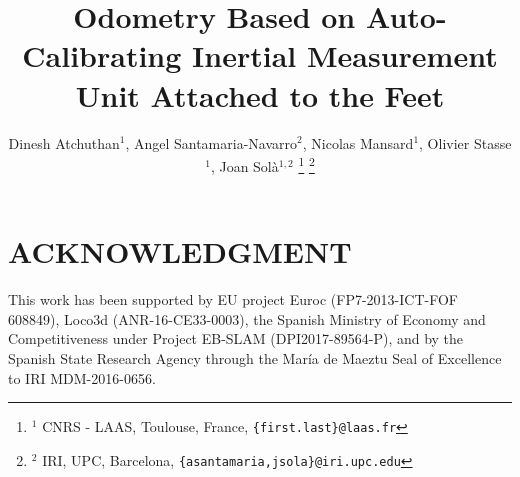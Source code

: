 \documentclass[letterpaper, 10 pt, conference]{ieeeconf}  %
\title{\LARGE \bf
Odometry Based on Auto-Calibrating Inertial Measurement Unit Attached to the Feet
}
\author{Dinesh Atchuthan$^{1}$, Angel Santamaria-Navarro$^{2}$, Nicolas Mansard$^1$, Olivier Stasse$^1$, Joan Sol\`a$^{1,2}$%
\thanks{$^{1}$ CNRS - LAAS, Toulouse, France, \tt {\footnotesize \{first.last\}@laas.fr}}%
\thanks{$^{2}$ IRI, UPC, Barcelona, \tt{\footnotesize \{asantamaria,jsola\}@iri.upc.edu}}
}
\begin{document}
\maketitle
\thispagestyle{empty}
\pagestyle{empty}

\begin{abstract}

\end{abstract}









\section*{ACKNOWLEDGMENT}
This work has been supported by  EU project Euroc (FP7-2013-ICT-FOF 608849),
Loco3d (ANR-16-CE33-0003), 
the Spanish Ministry of Economy and Competitiveness under Project EB-SLAM (DPI2017-89564-P), 
and by the Spanish State Research Agency through the María de Maeztu Seal of Excellence to IRI MDM-2016-0656.



\end{document}
